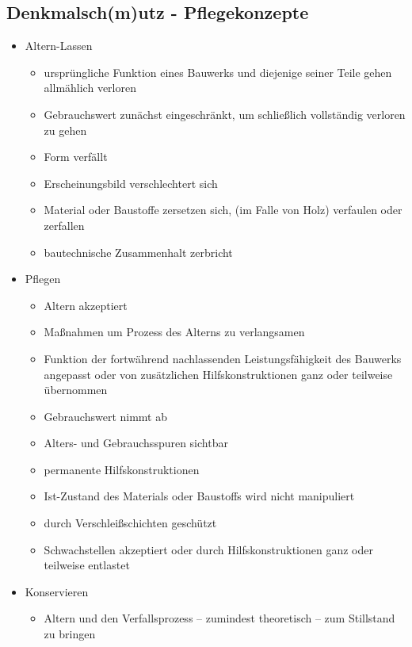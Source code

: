 \documentclass[fleqn,twoside]{article}
\begin{document}
    \subsection{Denkmalsch(m)utz - Pflegekonzepte}
    \begin{itemize}
        \item Altern-Lassen
            \begin{itemize}
                \item ursprüngliche Funktion eines Bauwerks und diejenige seiner Teile gehen allmählich verloren
                \item Gebrauchswert zunächst eingeschränkt, um schließlich vollständig verloren zu gehen
                \item Form verfällt
                \item Erscheinungsbild verschlechtert sich
                \item Material oder Baustoffe zersetzen sich, (im Falle von Holz) verfaulen oder zerfallen
                \item bautechnische Zusammenhalt zerbricht
            \end{itemize}
        \item Pflegen
            \begin{itemize}
                \item Altern akzeptiert
                \item Maßnahmen um Prozess des Alterns zu verlangsamen
                \item Funktion der fortwährend nachlassenden Leistungsfähigkeit des Bauwerks angepasst oder von zusätzlichen Hilfskonstruktionen ganz oder teilweise übernommen
                \item Gebrauchswert nimmt ab
                \item Alters- und Gebrauchsspuren sichtbar
                \item permanente Hilfskonstruktionen
                \item Ist-Zustand des Materials oder Baustoffs wird nicht manipuliert
                \item durch Verschleißschichten geschützt
                \item Schwachstellen akzeptiert oder durch Hilfskonstruktionen ganz oder teilweise entlastet
            \end{itemize}
        \item Konservieren
            \begin{itemize}
                \item Altern und den Verfallsprozess – zumindest theoretisch – zum Stillstand zu bringen

\end{itemize}
\end{itemize}
\end{document}

